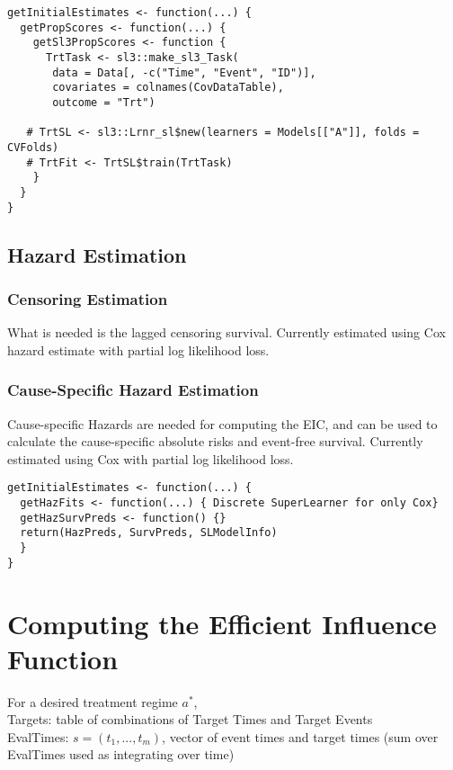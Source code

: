 \documentclass{report}
\newcommand{\1}{\ensuremath{\mathbf{1}}}
\newcommand{\trt}{\ensuremath{a^*}}
\begin{document}
\begin{lstlisting}
getInitialEstimates <- function(...) {
  getPropScores <- function(...) {
    getSl3PropScores <- function {
      TrtTask <- sl3::make_sl3_Task(
       data = Data[, -c("Time", "Event", "ID")],
       covariates = colnames(CovDataTable),
       outcome = "Trt")

   # TrtSL <- sl3::Lrnr_sl$new(learners = Models[["A"]], folds = CVFolds)
   # TrtFit <- TrtSL$train(TrtTask)
    }
  }
}
\end{lstlisting}


\subsection*{Hazard Estimation}
\label{sec:org3408e9f}

\subsubsection*{Censoring Estimation}
\label{sec:orgd0c6c9c}
What is needed is the lagged censoring survival. Currently estimated using Cox hazard estimate with partial log likelihood loss.

\subsubsection*{Cause-Specific Hazard Estimation}
\label{sec:org330eaf7}
Cause-specific Hazards are needed for computing the EIC, and can be used to calculate the cause-specific absolute risks and event-free survival.
Currently estimated using Cox with partial log likelihood loss.

\begin{lstlisting}
getInitialEstimates <- function(...) {
  getHazFits <- function(...) { Discrete SuperLearner for only Cox}
  getHazSurvPreds <- function() {}
  return(HazPreds, SurvPreds, SLModelInfo)
  }
}
\end{lstlisting}

\section*{Computing the Efficient Influence Function}
\label{sec:org79b60ae}
For a desired treatment regime \(\trt\),\\
Targets: table of combinations of Target Times and Target Events\\
EvalTimes: \(s = (t_1, ..., t_m)\), vector of event times and target times (sum over EvalTimes used as integrating over time)\\
\end{document}
